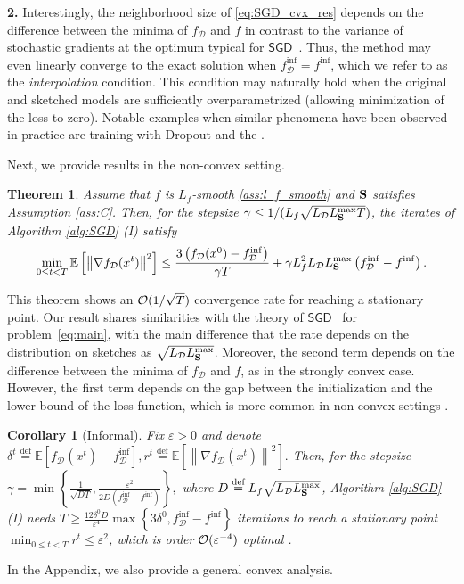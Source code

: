 \documentclass{article}
\newcommand\br[1]{\left ( #1 \right )}
\newcommand{\SGD}{$\mathsf{SGD}$}
\newcommand{\bb}{\mathbb}
\newcommand{\cO}{{\cal O}}
\newcommand{\eqdef}{\stackrel{\text{def}}{=}}
\newcommand{\Exp}[1]{{\bb E}\left[#1\right]}
\newtheorem{theorem}{Theorem}
\theoremstyle{plain}
\newtheorem{corollary}{Corollary}
\newcommand{\tf}{f_{\mathcal{D}}}
\newcommand{\mS}{{\bf S}}
\theoremstyle{plain}
\theoremstyle{definition}
\theoremstyle{remark}
\begin{document}
\textbf{2.} Interestingly, the neighborhood size of \eqref{eq:SGD_cvx_res} depends on the difference between the minima of $\tf$ and $f$ in contrast to the variance of stochastic gradients at the optimum typical for \SGD~\citep{gower2019sgd}. Thus, the method may even linearly converge to the exact solution when $\tf^{\inf} = f^{\inf}$, which we refer to as the \textit{interpolation} condition. This condition may naturally hold when the original and sketched models are sufficiently overparametrized (allowing minimization of the loss to zero). Notable examples when similar phenomena have been observed in practice are training with Dropout \citep{srivastava2014dropout} and the  \citep{frankle2018lottery}.

Next, we provide results in the non-convex setting.
\begin{theorem} \label{thm:sgd_nonconvex}
	Assume that $f$ is $L_f$-smooth \eqref{ass:l_f_smooth} and $\mS$ satisfies Assumption \ref{ass:C}. Then, for the stepsize $\gamma\leq 1/(L_f\sqrt{L_{\mathcal{D}}L_{\mS}^{\max} T})$,
	the iterates of Algorithm \ref{alg:SGD} (I) satisfy
	\begin{equation*} \label{eq:SGD_noncvx_res}
			\min \limits_{0\leq t < T} \Exp{\left\|\nabla \tf(x^t)\right\|^2} \leq \frac{3 \br{\tf(x^0) - \tf^{\inf}}}{\gamma T}
			 + \gamma L_f^2 L_{\mathcal{D}} L_{\mS}^{\max} \br{\tf^{\inf} - f^{\inf}}.
	\end{equation*}
\end{theorem}
This theorem shows an $\cO(1/\sqrt{T})$ convergence rate for reaching a stationary point. Our result shares similarities with the theory of \SGD~\citep{khaled2020better} for problem~\eqref{eq:main}, with the main difference that the rate depends on the distribution on sketches as $\sqrt{L_{\mathcal{D}} L_{\mS}^{\max}}$.
Moreover, the second term depends on the difference between the minima of $\tf$ and $f$, as in the strongly convex case. However, the first term depends on the gap between the initialization and the lower bound of the loss function, which is more common in non-convex settings \citep{khaled2020better}.

\begin{corollary}[Informal] \label{cor:sgd_nonconvex}
	Fix $\varepsilon > 0$ and denote
	$\delta^t \eqdef \Exp{\tf(x^t) - \tf^{\inf}},  r^t \eqdef \Exp{\left\|\nabla \tf(x^t)\right\|^2}.$
	Then, for the stepsize	$
		\gamma = \min\left\lbrace \frac{1}{\sqrt{DT}}, \frac{\varepsilon^2}{2D\left(\tf^{\inf} - f^{\inf}\right)} \right\rbrace,
	$
	where $D \eqdef L_f \sqrt{L_{\mathcal{D}}L_{\mS}^{\max} }$, Algorithm \ref{alg:SGD} (I) needs
	$
		T\geq \frac{12 \delta^0 D}{\varepsilon^4} \max\left\lbrace 3\delta^0, \tf^{\inf} - f^{\inf}\right\rbrace
	$
	iterations to reach a stationary point $\min_{0 \leq t < T} r^t \leq \varepsilon^2$, which is order $\cO(\varepsilon^{-4})$ optimal \citep{ghadimi2013stochastic, drori2020complexity}.
\end{corollary}
In the Appendix, we also provide a general convex analysis.
\end{document}
